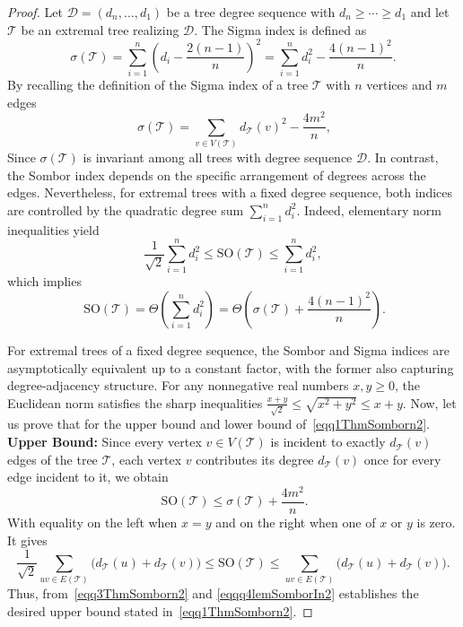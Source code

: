 \documentclass[12pt, a4paper]{article}
\newcommand{\TT}{\mathcal{T}}
\newcommand{\SO}{\mathrm{SO}}
\begin{document}
\begin{proof}
Let $\mathscr{D}=(d_n,\dots,d_1)$ be a tree degree sequence with $d_n \geqslant \cdots \geqslant d_1$ and let $\TT$ be an extremal tree realizing $\mathscr{D}$. The Sigma index is defined as
\[
\sigma(\TT)=\sum_{i=1}^n \left( d_i-\frac{2(n-1)}{n}\right)^2=\sum_{i=1}^n d_i^2-\frac{4(n-1)^2}{n}.
\]
By recalling the definition of the Sigma index of a tree $\TT$ with $n$ vertices and $m$ edges
\begin{equation}~\label{eqq2ThmSomborn2}
\sigma(\TT) = \sum_{v\in V(\TT)} d_\TT(v)^2 - \frac{4m^2}{n},
\end{equation}
Since $\sigma(\TT)$ is invariant among all trees with degree sequence $\mathscr{D}$. In contrast, the Sombor index depends on the specific arrangement of degrees across the edges. Nevertheless, for extremal trees with a fixed degree sequence, both indices are controlled by the quadratic degree sum $\sum_{i=1}^n d_i^2$. Indeed, elementary norm inequalities yield
\[
\frac{1}{\sqrt{2}} \sum_{i=1}^n d_i^2 \leqslant \SO(\TT) \leqslant \sum_{i=1}^n d_i^2,
\]
which implies
\begin{equation}~\label{eqq02ThmSomborn2}
\SO(\TT)=\Theta\!\left( \sum_{i=1}^n d_i^2 \right)=\Theta\!\left(\sigma(\TT)+\frac{4(n-1)^2}{n}\right).
\end{equation}

For extremal trees of a fixed degree sequence, the Sombor and Sigma indices are asymptotically equivalent up to a constant factor, with the former also capturing degree-adjacency structure. For any nonnegative real numbers $x,y \geq 0$, the Euclidean norm satisfies the sharp inequalities
$\frac{x+y}{\sqrt{2}} \leq \sqrt{x^2 + y^2} \leq x + y$. Now, let us prove that for the upper bound and lower bound of~\eqref{eqq1ThmSomborn2}. 
\noindent\textbf{Upper Bound:} Since every vertex $v \in V(\mathcal{T})$ is incident to exactly $d_{\mathcal{T}}(v)$ edges of the tree $\mathcal{T}$, each vertex $v$ contributes its degree $d_{\mathcal{T}}(v)$ once for every edge incident to it, we obtain
\begin{equation}~\label{eqq3ThmSomborn2}
\SO(\TT)\leqslant \sigma(\TT)+\frac{4m^2}{n}.
\end{equation}
With equality on the left when $x=y$ and on the right when one of $x$ or $y$ is zero. It gives
\begin{equation}\label{eqq4ThmSomborn2}
\frac{1}{\sqrt{2}} \sum_{uv\in E(\TT)} \bigl( d_\TT(u) + d_\TT(v) \bigr)
\leq \SO(\TT)
\leq \sum_{uv\in E(\TT)} \bigl( d_\TT(u) + d_\TT(v) \bigr).
\end{equation}
Thus, from~\eqref{eqq3ThmSomborn2} and \eqref{eqqq4lemSomborIn2} establishes the desired upper bound stated in~\eqref{eqq1ThmSomborn2}.


\end{proof}
\end{document}
